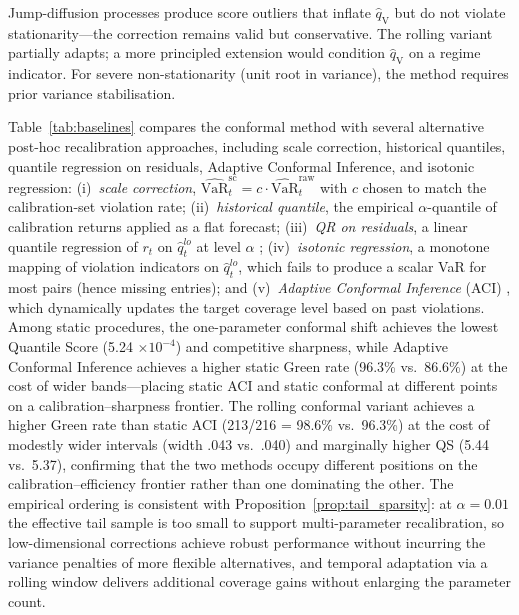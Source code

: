 \documentclass[preprint,11pt,authoryear]{elsarticle}
\newcommand{\VaR}{\mathrm{VaR}}
\newcommand{\1}{\boldsymbol{1}}
\newcommand{\qV}{\hat{q}_{\scriptscriptstyle\mathrm{V}}}
\begin{document}
	Jump-diffusion processes \citep{merton1976option} produce
	score outliers that inflate $\qV$ but do not violate
	stationarity---the correction remains valid but conservative.
	The rolling variant partially adapts; a more principled
	extension would condition $\qV$ on a regime indicator. For
	severe non-stationarity (unit root in variance), the method
	requires prior variance stabilisation.
	
	Table~\ref{tab:baselines} compares the conformal method with
	several alternative post-hoc recalibration approaches, including scale correction, historical quantiles, quantile regression on residuals, Adaptive Conformal Inference, and isotonic regression: (i)~\emph{scale correction},
	$\widehat{\VaR}_t^{\mathrm{sc}} = c \cdot
	\widehat{\VaR}_t^{\mathrm{raw}}$ with $c$ chosen to match the
	calibration-set violation rate; (ii)~\emph{historical quantile},
	the empirical $\alpha$-quantile of calibration returns applied
	as a flat forecast; (iii)~\emph{QR on residuals}, a linear
	quantile regression of $r_t$ on $\hat{q}_t^{lo}$ at level
	$\alpha$ \citep[cf.][]{romano2019conformalized};
	(iv)~\emph{isotonic regression}, a monotone mapping of
	violation indicators on $\hat{q}_t^{lo}$, which fails to
	produce a scalar VaR for most pairs (hence missing entries); and
	(v)~\emph{Adaptive Conformal Inference} (ACI) \citep{gibbs2021adaptive}, which dynamically updates the target coverage level based on past violations.
	Among static procedures, the one-parameter conformal shift achieves the lowest Quantile Score (5.24 $\times 10^{-4}$) and competitive sharpness, while Adaptive Conformal Inference \citep{gibbs2021adaptive} achieves a higher static Green rate (96.3\% vs.\ 86.6\%) at the cost of wider bands---placing static ACI and static conformal at different points on a calibration--sharpness frontier. The rolling conformal variant achieves a higher Green rate than static ACI (213/216 = 98.6\% vs.\ 96.3\%) at the cost of modestly wider intervals (width .043 vs.\ .040) and marginally higher QS (5.44 vs.\ 5.37), confirming that the two methods occupy different positions on the calibration--efficiency frontier rather than one dominating the other. The empirical ordering is consistent with Proposition~\ref{prop:tail_sparsity}: at $\alpha = 0.01$ the effective tail sample is too small to support multi-parameter recalibration, so low-dimensional corrections achieve robust performance without incurring the variance penalties of more flexible alternatives, and temporal adaptation via a rolling window delivers additional coverage gains without enlarging the parameter count.
\end{document}
